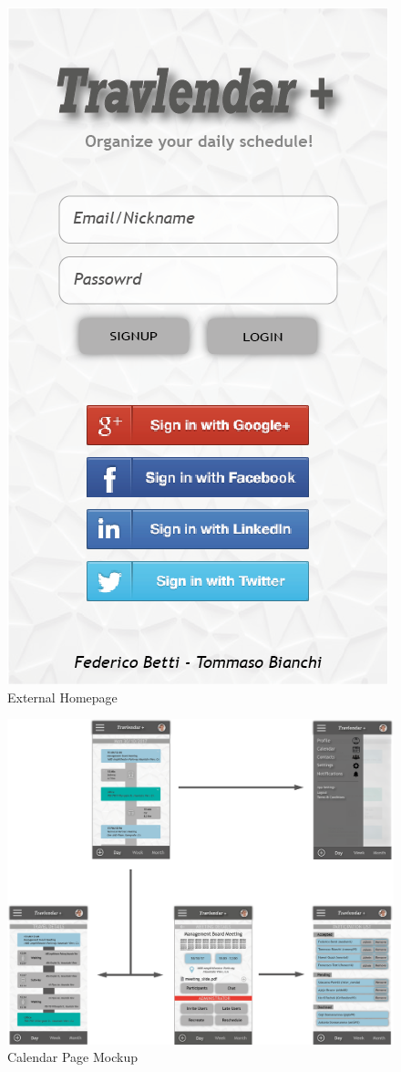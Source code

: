 \begin{figure}[h]
	\centering\includegraphics[scale = 0.35]{Images/Mockups/HomePage.png}{}
	\caption{External Homepage}
\end{figure}

\begin{figure}[h]
\centering\includegraphics[width = \textwidth, scale = 0.3]{Images/Mockups/CalendarPage+.png}{}
\caption{Calendar Page Mockup}
\end{figure}


